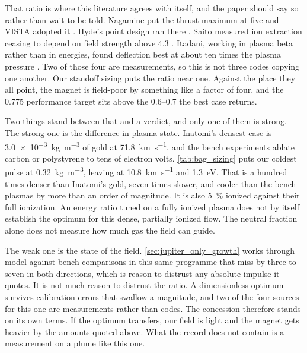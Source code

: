 \documentclass{article}
\begin{document}
That ratio is where this literature agrees with itself, and the paper should say so rather than wait to be told. Nagamine put the thrust maximum at five and VISTA adopted it \cite{nagamine1999analysis,orth2003vista}. Hyde's point design ran there \cite{hyde1983laserfusion_rocket}. Saito measured ion extraction ceasing to depend on field strength above \num{4.3} \cite{saito2018extraction}. Itadani, working in plasma beta rather than in energies, found deflection best at about ten times the plasma pressure \cite{itadani2018thomson}. Two of those four are measurements, so this is not three codes copying one another. Our standoff sizing puts the ratio near one. Against the place they all point, the magnet is field-poor by something like a factor of four, and the \num{0.775} performance target sits above the \numrange{0.6}{0.7} the best case returns.

Two things stand between that and a verdict, and only one of them is strong. The strong one is the difference in plasma state. Inatomi's densest case is \SI{3.0e-3}{\kilogram\per\cubic\meter} of gold at \SI{71.8}{\kilo\meter\per\second}, and the bench experiments ablate carbon or polystyrene to tens of electron volts. \autoref{tab:bag_sizing} puts our coldest pulse at \SI{0.32}{\kilogram\per\cubic\meter}, leaving at \SI{10.8}{\kilo\meter\per\second} and \SI{1.3}{\electronvolt}. That is a hundred times denser than Inatomi's gold, seven times slower, and cooler than the bench plasmas by more than an order of magnitude. It is also \SI{5}{\percent} ionized against their full ionization. An energy ratio tuned on a fully ionized plasma does not by itself establish the optimum for this dense, partially ionized flow. The neutral fraction alone does not measure how much gas the field can guide.

The weak one is the state of the field. \autoref{sec:jupiter_only_growth} works through model-against-bench comparisons in this same programme that miss by three to seven in both directions, which is reason to distrust any absolute impulse it quotes. It is not much reason to distrust the ratio. A dimensionless optimum survives calibration errors that swallow a magnitude, and two of the four sources for this one are measurements rather than codes. The concession therefore stands on its own terms. If the optimum transfers, our field is light and the magnet gets heavier by the amounts quoted above. What the record does not contain is a measurement on a plume like this one.
\end{document}
